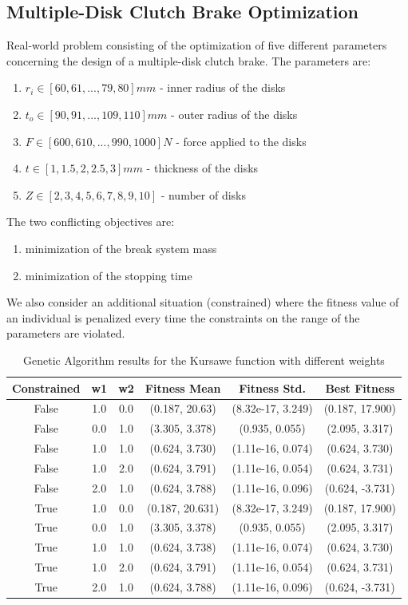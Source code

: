 \subsection{Multiple-Disk Clutch Brake Optimization}
Real-world problem consisting of the optimization of five different parameters concerning the design of a multiple-disk clutch brake. The parameters are:
\begin{enumerate}
    \item $r_i \in [60,61,...,79,80]mm$ - inner radius of the disks
    \item $t_o \in [90,91,...,109,110]mm$ - outer radius of the disks
    \item $F \in [600,610,...,990,1000]N$ - force applied to the disks
    \item $t \in [1,1.5,2,2.5,3]mm$ - thickness of the disks
    \item $Z \in [2,3,4,5,6,7,8,9,10]$ - number of disks
\end{enumerate}
The two conflicting objectives are:
\begin{enumerate}
    \item minimization of the break system mass
    \item minimization of the stopping time
\end{enumerate}
We also consider an additional situation (constrained) where the fitness value of an individual is penalized every time the constraints on the range of the parameters are violated.
\begin{table}[H]
    \centering
    \begin{tabular}{|c|c|c|c|c|c|}
        Constrained & w1  & w2  & Fitness Mean    & Fitness Std.      & Best Fitness    \\ \hline
        False       & 1.0 & 0.0 & (0.187, 20.63)  & (8.32e-17, 3.249) & (0.187, 17.900) \\
        False       & 0.0 & 1.0 & (3.305, 3.378)  & (0.935, 0.055)    & (2.095, 3.317)  \\
        False       & 1.0 & 1.0 & (0.624, 3.730)  & (1.11e-16, 0.074) & (0.624, 3.730)  \\
        False       & 1.0 & 2.0 & (0.624, 3.791)  & (1.11e-16, 0.054) & (0.624, 3.731)  \\
        False       & 2.0 & 1.0 & (0.624, 3.788)  & (1.11e-16, 0.096) & (0.624, -3.731) \\ \hline

        True        & 1.0 & 0.0 & (0.187, 20.631) & (8.32e-17, 3.249) & (0.187, 17.900) \\
        True        & 0.0 & 1.0 & (3.305, 3.378)  & (0.935, 0.055)    & (2.095, 3.317)  \\
        True        & 1.0 & 1.0 & (0.624, 3.738)  & (1.11e-16, 0.074) & (0.624, 3.730)  \\
        True        & 1.0 & 2.0 & (0.624, 3.791)  & (1.11e-16, 0.054) & (0.624, 3.731)  \\
        True        & 2.0 & 1.0 & (0.624, 3.788)  & (1.11e-16, 0.096) & (0.624, -3.731) \\
    \end{tabular}
    \caption{Genetic Algorithm results for the Kursawe function with different weights}
    \label{tab:disk_ga}
\end{table}
